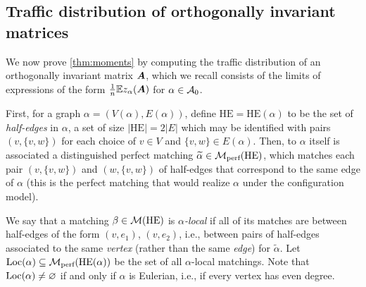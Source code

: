 \subsection{Traffic distribution of orthogonally invariant matrices}

We now prove \cref{thm:moments} by computing the traffic distribution of an orthogonally invariant matrix ${\bm A}$, which we recall consists of the limits of expressions of the form $\frac{1}{n}\mathbb{E} z_{\alpha}({\bm A})$ for $\alpha \in {\cal A}_0$.

First, for a graph $\alpha = (V(\alpha), E(\alpha))$, define $\mathrm{HE} = \mathrm{HE}(\alpha)$ to be the set of \emph{half-edges} in $\alpha$, a set of size $|\mathrm{HE}| = 2|E|$ which may be identified with pairs $(v, \{v, w\})$ for each choice of $v \in V$ and $\{v, w\} \in E(\alpha)$.
Then, to $\alpha$ itself is associated a distinguished perfect matching $\widetilde{\alpha} \in \mathcal{M}_{\textnormal{perf}}(\mathrm{HE})$, which matches each pair $(v, \{v, w\})$ and $(w, \{v, w\})$ of half-edges that correspond to the same edge of $\alpha$ (this is the perfect matching that would realize $\alpha$ under the configuration model).

We say that a matching $\beta \in {\cal M}(\mathrm{HE})$ is \emph{$\alpha$-local} if all of its matches are between half-edges of the form $(v, e_1)$, $(v, e_2)$, i.e., between pairs of half-edges associated to the same \emph{vertex} (rather than the same \emph{edge}) for $\widetilde{\alpha}$.
Let $\mathrm{Loc}(\alpha) \subseteq \mathcal{M}_{\textnormal{perf}}(\mathrm{HE}(\alpha))$ be the set of all $\alpha$-local matchings.
Note that $\mathrm{Loc}(\alpha) \neq \varnothing$ if and only if $\alpha$ is Eulerian, i.e., if every vertex has even degree.

